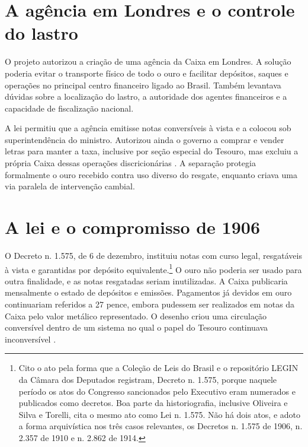 \section{A agência em Londres e o controle do lastro}

O projeto autorizou a criação de uma agência da Caixa em Londres. A solução poderia evitar o transporte físico de todo o ouro e facilitar depósitos, saques e operações no principal centro financeiro ligado ao Brasil. Também levantava dúvidas sobre a localização do lastro, a autoridade dos agentes financeiros e a capacidade de fiscalização nacional.

A lei permitiu que a agência emitisse notas conversíveis à vista e a colocou sob superintendência do ministro. Autorizou ainda o governo a comprar e vender letras para manter a taxa, inclusive por seção especial do Tesouro, mas excluiu a própria Caixa dessas operações discricionárias \cite{brasil1906caixa}. A separação protegia formalmente o ouro recebido contra uso diverso do resgate, enquanto criava uma via paralela de intervenção cambial.


\section{A lei e o compromisso de 1906}

O Decreto n. 1.575, de 6 de dezembro, instituiu notas com curso legal, resgatáveis à vista e garantidas por depósito equivalente.\footnote{Cito o ato pela forma que a Coleção de Leis do Brasil e o repositório LEGIN da Câmara dos Deputados registram, Decreto n. 1.575, porque naquele período os atos do Congresso sancionados pelo Executivo eram numerados e publicados como decretos. Boa parte da historiografia, inclusive Oliveira e Silva e Torelli, cita o mesmo ato como Lei n. 1.575. Não há dois atos, e adoto a forma arquivística nos três casos relevantes, os Decretos n. 1.575 de 1906, n. 2.357 de 1910 e n. 2.862 de 1914.} O ouro não poderia ser usado para outra finalidade, e as notas resgatadas seriam inutilizadas. A Caixa publicaria mensalmente o estado de depósitos e emissões. Pagamentos já devidos em ouro continuariam referidos a 27 pence, embora pudessem ser realizados em notas da Caixa pelo valor metálico representado. O desenho criou uma circulação conversível dentro de um sistema no qual o papel do Tesouro continuava inconversível \cite{brasil1906caixa,oliveirasilva2001}.


